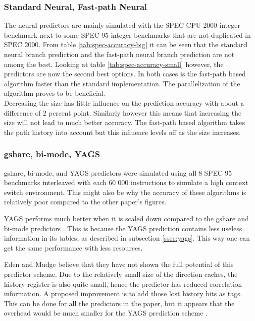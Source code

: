 \subsubsection*{Standard Neural, Fast-path Neural}
The neural predictors are mainly simulated with the SPEC CPU 2000 integer benchmark next to some SPEC 95 integer benchmarks that are not duplicated in SPEC 2000. From table \ref{tab:spec-accuracy-big} it can be seen that the standard neural branch prediction and the fast-path neural branch prediction are not among the best. Looking at table \ref{tab:spec-accuracy-small} however, the predictors are now the second best options. In both cases is the fast-path based algorithm faster than the standard implementation. The parallelization of the algorithm proves to be beneficial. \\
Decreasing the size has little influence on the prediction accuracy with about a difference of 2 percent point. Similarly however this means that increasing the size will not lead to much better accuracy. The fast-path based algorithm takes the path history into account but this influence levels off as the size increases.

\subsubsection*{gshare, bi-mode, YAGS}
gshare, bi-mode, and YAGS predictors were simulated using all 8 SPEC 95 benchmarks interleaved with each 60 000 instructions to simulate a high context switch environment.
This might also be why the accuracy of these algorithms is relatively poor compared to the other paper's figures.

YAGS performs much better when it is scaled down compared to the gshare and bi-mode predictors \cite{yags}.
This is because the YAGS prediction contains less useless information in its tables, as described in subsection \ref{ssec:yags}.
This way one can get the same performance with less resources.

Eden and Mudge believe that they have not shown the full potential of this predictor scheme.
Due to the relatively small size of the direction caches, the history register is also quite small, hence the predictor has reduced correlation information.
A proposed improvement is to add those lost history bits as tags.
This can be done for all the predictors in the paper, but it appears that the overhead would be much smaller for the YAGS prediction scheme \cite{yags}. 
